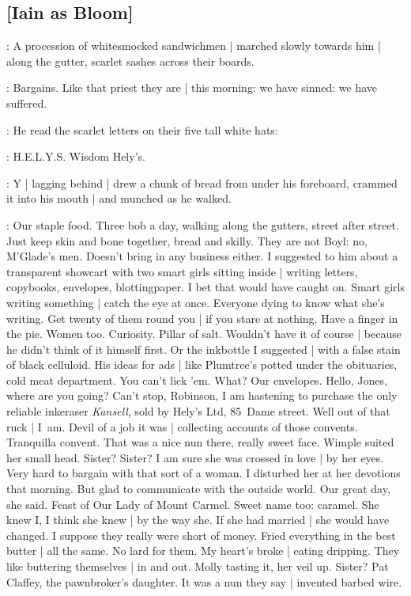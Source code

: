 \subsection{[Iain as Bloom]}

:
A procession of whitesmocked sandwichmen |
marched slowly towards him |
along the gutter,
scarlet sashes across their boards.

\BloomInt:
Bargains.
Like that priest they are |
this morning:
we have sinned:
we have suffered.

:
He read the scarlet letters on their five tall white hats:

\BloomInt:
H.E.L.Y.S\@.
\stage{[H—E—L—Y—apostrophe~S]}
Wisdom Hely's.

:
Y |
lagging behind |
drew a chunk of bread from under his foreboard,
crammed it into his mouth |
and munched as he walked.

\BloomInt:
Our staple food.
Three bob a day,
walking along the gutters,
street after street.
Just keep skin and bone together,
bread and skilly.
They are not Boyl:
no, M'Glade's men.
Doesn't bring in any business either.
I suggested to him about a transparent showcart
with two smart girls sitting inside |
writing letters, copybooks, envelopes, blottingpaper.
I bet that would have caught on.
Smart girls writing something |
catch the eye at once.
Everyone dying to know what she's writing.
Get twenty of them round you |
if you stare at nothing.
Have a finger in the pie.
Women too.
Curiosity.
Pillar of salt.
Wouldn't have it of course |
because he didn't think of it himself first.
Or the inkbottle I suggested |
with a false stain of black celluloid.
His ideas for ads |
like Plumtree's potted under the obituaries,
cold meat department.
You can't lick 'em.
What?
Our envelopes.
Hello, Jones, where are you going?
Can't stop, Robinson,
I am hastening to purchase the only reliable ink\-eraser \emph{Kansell},
sold by Hely's Ltd,
85~Dame street.
Well out of that ruck |
I~am.
Devil of a job it was |
collecting accounts of those convents.
Tranquilla convent.
That was a nice nun there,
really sweet face.
Wimple suited her small head.
Sister?
Sister?
I am sure she was crossed in love |
by her eyes.
Very hard to bargain with that sort of a woman.
I disturbed her at her devotions that morning.
But glad to communicate with the outside world.
Our great day,
she said.
Feast of Our Lady of Mount Carmel.
Sweet name too:
caramel.
She knew I,
I think she knew |
by the way she.
If she had married |
she would have changed.
I suppose they really were short of money.
Fried everything in the best butter |
all the same.
No lard for them.
My heart's broke |
eating dripping.
They like buttering themselves |
in and out.
Molly tasting it,
her veil up.
Sister?
Pat Claffey,
the pawnbroker's daughter.
It was a nun they say |
invented barbed wire.

